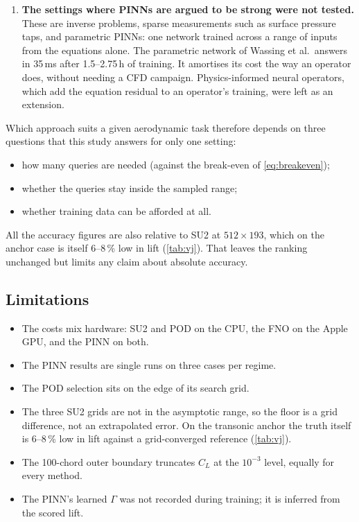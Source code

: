 \documentclass[11pt]{article}
\newcommand{\CL}{C_L}
\begin{document}
\begin{enumerate}
    generalise across shapes and meshes. None of that was tested.
  \item \textbf{The settings where PINNs are argued to be strong were not tested.} These are
    inverse problems, sparse measurements such as surface pressure taps, and parametric PINNs: one
    network trained across a range of inputs from the equations alone. The parametric network of
    Wassing et al.\ answers in 35\,ms after 1.5--2.75\,h of training. It amortises its cost the way
    an operator does, without needing a CFD campaign. Physics-informed neural operators, which add
    the equation residual to an operator's training, were left as an extension.
\end{enumerate}

Which approach suits a given aerodynamic task therefore depends on three questions that this study
answers for only one setting:
\begin{itemize}
  \item how many queries are needed (against the break-even of \cref{eq:breakeven});
  \item whether the queries stay inside the sampled range;
  \item whether training data can be afforded at all.
\end{itemize}
All the accuracy figures are also relative to SU2 at $512\times193$, which on the anchor case is
itself 6--8\,\% low in lift (\cref{tab:vj}). That leaves the ranking unchanged but limits any claim
about absolute accuracy.

\subsection{Limitations}
\begin{itemize}
  \item The costs mix hardware: SU2 and POD on the CPU, the FNO on the Apple GPU, and the PINN on
    both.
  \item The PINN results are single runs on three cases per regime.
  \item The POD selection sits on the edge of its search grid.
  \item The three SU2 grids are not in the asymptotic range, so the floor is a grid difference,
    not an extrapolated error. On the transonic anchor the truth itself is 6--8\,\% low in lift
    against a grid-converged reference (\cref{tab:vj}).
  \item The 100-chord outer boundary truncates $\CL$ at the $10^{-3}$ level, equally for every
    method.
  \item The PINN's learned $\Gamma$ was not recorded during training; it is inferred from the
    scored lift.
\end{itemize}
\end{document}

